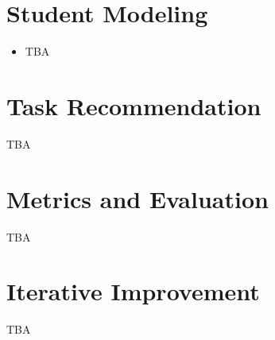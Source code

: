 \section{Student Modeling}
\label{sec:student-modeling}

\begin{itemize}
\item TBA
\end{itemize}

\section{Task Recommendation}
\label{sec:task-recommendation}

TBA


\section{Metrics and Evaluation}
\label{sec:metrics-and-evaluation}

TBA


\section{Iterative Improvement}
\label{sec:iterative-improvement}

TBA
